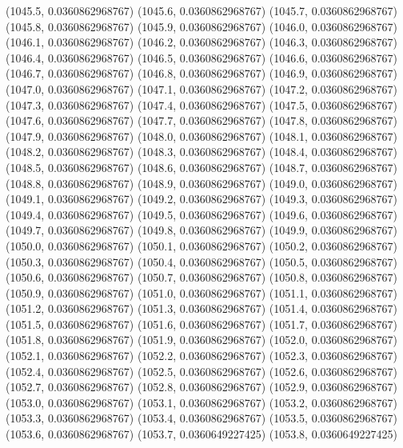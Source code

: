 {					(1045.5, 0.0360862968767)
					(1045.6, 0.0360862968767)
					(1045.7, 0.0360862968767)
					(1045.8, 0.0360862968767)
					(1045.9, 0.0360862968767)
					(1046.0, 0.0360862968767)
					(1046.1, 0.0360862968767)
					(1046.2, 0.0360862968767)
					(1046.3, 0.0360862968767)
					(1046.4, 0.0360862968767)
					(1046.5, 0.0360862968767)
					(1046.6, 0.0360862968767)
					(1046.7, 0.0360862968767)
					(1046.8, 0.0360862968767)
					(1046.9, 0.0360862968767)
					(1047.0, 0.0360862968767)
					(1047.1, 0.0360862968767)
					(1047.2, 0.0360862968767)
					(1047.3, 0.0360862968767)
					(1047.4, 0.0360862968767)
					(1047.5, 0.0360862968767)
					(1047.6, 0.0360862968767)
					(1047.7, 0.0360862968767)
					(1047.8, 0.0360862968767)
					(1047.9, 0.0360862968767)
					(1048.0, 0.0360862968767)
					(1048.1, 0.0360862968767)
					(1048.2, 0.0360862968767)
					(1048.3, 0.0360862968767)
					(1048.4, 0.0360862968767)
					(1048.5, 0.0360862968767)
					(1048.6, 0.0360862968767)
					(1048.7, 0.0360862968767)
					(1048.8, 0.0360862968767)
					(1048.9, 0.0360862968767)
					(1049.0, 0.0360862968767)
					(1049.1, 0.0360862968767)
					(1049.2, 0.0360862968767)
					(1049.3, 0.0360862968767)
					(1049.4, 0.0360862968767)
					(1049.5, 0.0360862968767)
					(1049.6, 0.0360862968767)
					(1049.7, 0.0360862968767)
					(1049.8, 0.0360862968767)
					(1049.9, 0.0360862968767)
					(1050.0, 0.0360862968767)
					(1050.1, 0.0360862968767)
					(1050.2, 0.0360862968767)
					(1050.3, 0.0360862968767)
					(1050.4, 0.0360862968767)
					(1050.5, 0.0360862968767)
					(1050.6, 0.0360862968767)
					(1050.7, 0.0360862968767)
					(1050.8, 0.0360862968767)
					(1050.9, 0.0360862968767)
					(1051.0, 0.0360862968767)
					(1051.1, 0.0360862968767)
					(1051.2, 0.0360862968767)
					(1051.3, 0.0360862968767)
					(1051.4, 0.0360862968767)
					(1051.5, 0.0360862968767)
					(1051.6, 0.0360862968767)
					(1051.7, 0.0360862968767)
					(1051.8, 0.0360862968767)
					(1051.9, 0.0360862968767)
					(1052.0, 0.0360862968767)
					(1052.1, 0.0360862968767)
					(1052.2, 0.0360862968767)
					(1052.3, 0.0360862968767)
					(1052.4, 0.0360862968767)
					(1052.5, 0.0360862968767)
					(1052.6, 0.0360862968767)
					(1052.7, 0.0360862968767)
					(1052.8, 0.0360862968767)
					(1052.9, 0.0360862968767)
					(1053.0, 0.0360862968767)
					(1053.1, 0.0360862968767)
					(1053.2, 0.0360862968767)
					(1053.3, 0.0360862968767)
					(1053.4, 0.0360862968767)
					(1053.5, 0.0360862968767)
					(1053.6, 0.0360862968767)
					(1053.7, 0.0360649227425)
					(1053.8, 0.0360649227425)
}
